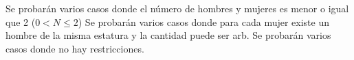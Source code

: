 \documentclass{oci}
\begin{document}
\begin{scoreDescription}
   Se probarán varios casos donde el número de hombres y mujeres es menor o igual que 2 ($0 < N \leq 2$)
   Se probarán varios casos donde para cada mujer existe un hombre de la misma estatura y la cantidad puede ser arb.
   Se probarán varios casos donde no hay restricciones.
\end{scoreDescription}

\begin{sampleDescription}
\end{sampleDescription}
\end{document}
